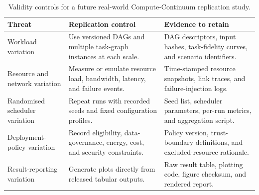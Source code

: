 \begin{table}[t]
\centering
\caption{Validity controls for a future real-world Compute-Continuum replication study.}
\label{tab:validity_controls}
\small
\begin{tabular}{|p{}|p{}|p{}|}
\hline
\textbf{Threat} & \textbf{Replication control} & \textbf{Evidence to retain} \\
\hline
Workload variation & Use versioned DAGs and multiple task-graph instances at each scale. & DAG descriptors, input hashes, task-fidelity curves, and scenario identifiers. \\
\hline
Resource and network variation & Measure or emulate resource load, bandwidth, latency, and failure events. & Time-stamped resource snapshots, link traces, and failure-injection logs. \\
\hline
Randomised scheduler variation & Repeat runs with recorded seeds and fixed configuration profiles. & Seed list, scheduler parameters, per-run metrics, and aggregation script. \\
\hline
Deployment-policy variation & Record eligibility, data-governance, energy, cost, and security constraints. & Policy version, trust-boundary definitions, and excluded-resource rationale. \\
\hline
Result-reporting variation & Generate plots directly from released tabular outputs. & Raw result table, plotting code, figure checksum, and rendered report. \\
\hline
\end{tabular}
\end{table}
